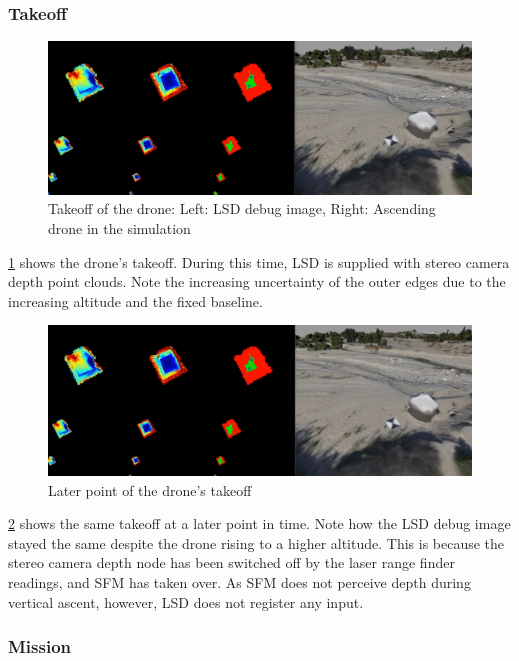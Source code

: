 \subsubsection{Takeoff}

\begin{figure}[h]
\centering
\includegraphics[scale=0.27]{images/autonomous_landing/demo_flight/takeoff1.png}
\caption{Takeoff of the drone: Left: LSD debug image, Right: Ascending drone in the simulation}
\label{fig:demo_takeoff1}
\end{figure}

\cref{fig:demo_takeoff1} shows the drone's takeoff. During this time, LSD is supplied with stereo camera depth point clouds. Note the increasing uncertainty of the outer edges due to the increasing altitude and the fixed baseline.

\begin{figure}[h]
\centering
\includegraphics[scale=0.27]{images/autonomous_landing/demo_flight/takeoff2.png}
\caption{Later point of the drone's takeoff}
\label{fig:demo_takeoff2}
\end{figure}

\cref{fig:demo_takeoff2} shows the same takeoff at a later point in time. Note how the LSD debug image stayed the same despite the drone rising to a higher altitude. This is because the stereo camera depth node has been switched off by the laser range finder readings, and SFM has taken over. As SFM does not perceive depth during vertical ascent, however, LSD does not register any input.

\subsubsection{Mission}

